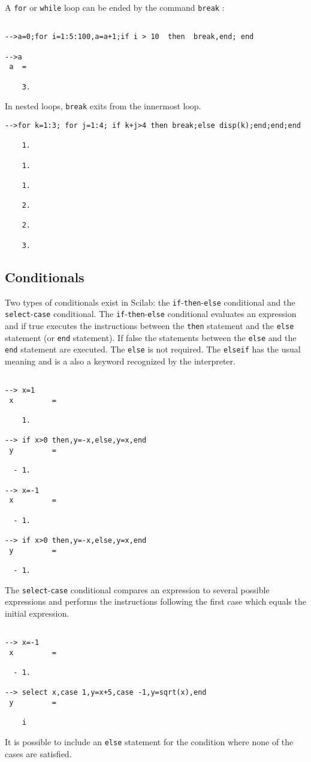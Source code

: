  A {\tt for} or {\tt while} loop can be ended by the command {\tt break} :
\begin{verbatim}

-->a=0;for i=1:5:100,a=a+1;if i > 10  then  break,end; end
 
-->a
 a  =
 
    3.  

\end{verbatim}
In nested loops, {\tt break} exits from the innermost loop.

\begin{verbatim}
-->for k=1:3; for j=1:4; if k+j>4 then break;else disp(k);end;end;end
 
    1.  
 
    1.  
 
    1.  
 
    2.  
 
    2.  
 
    3. 
\end{verbatim}
\subsection{Conditionals}
Two types of conditionals exist in Scilab: the 
{\tt if}-{\tt then}-{\tt else}
conditional and the 
{\tt select}-{\tt case} 
conditional.  The 
{\tt if}-{\tt then}-{\tt else} conditional
evaluates an expression and if true executes the
instructions between the {\tt then} statement and the {\tt else} statement
(or {\tt end} statement).
If false the statements between the {\tt else} and the {\tt end}
statement are executed.  The {\tt else} is not required. The {\tt elseif}
has the usual meaning and is a also a keyword recognized by the interpreter.
\begin{verbatim}
 
--> x=1
 x         =
 
    1.  
 
--> if x>0 then,y=-x,else,y=x,end
 y         =
 
  - 1.  
 
--> x=-1
 x         =
 
  - 1.  
 
--> if x>0 then,y=-x,else,y=x,end
 y         =
 
  - 1.  
\end{verbatim}


	The {\tt select}-{\tt case} conditional
compares an expression to several possible expressions and performs the
instructions following the first case which equals the initial expression.
\begin{verbatim}
 
--> x=-1
 x         =
 
  - 1.  
 
--> select x,case 1,y=x+5,case -1,y=sqrt(x),end
 y         =
 
    i    
\end{verbatim}
It is possible to include an {\tt else} statement for the condition
where none of the cases are satisfied.

